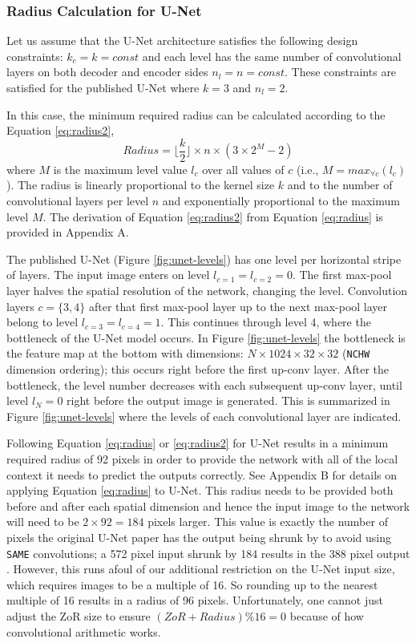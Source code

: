 \documentclass[letterpaper]{article} %
\begin{document}
\subsubsection{Radius Calculation for U-Net}

Let us assume that the U-Net architecture satisfies the following design constraints:
$k_c = k = const$ and each level has the same number of convolutional layers on both decoder and encoder sides $n_l = n = const$. These constraints are satisfied for the published U-Net where $k = 3$ and $n_l = 2$.

In this case, the minimum required radius can be calculated according to the Equation \ref{eq:radius2}, 
\begin{equation}
Radius = \lfloor \frac{k}{2} \rfloor \times n \times (3 \times 2^{M} - 2)
\label{eq:radius2}
\end{equation}
where $M$ is the maximum level value $l_c$ over all values of $c$ (i.e., $M=max_{\forall c} (l_c)$). The radius is linearly proportional to the kernel size $k$ and to the number of convolutional layers per level $n$ and exponentially proportional to the maximum level $M$. The derivation of Equation \ref{eq:radius2} from Equation \ref{eq:radius} is provided in Appendix A.

The published U-Net (Figure \ref{fig:unet-levels}) has one level per horizontal stripe of layers. The input image enters on level $l_{c=1} = l_{c=2} = 0$. The first max-pool layer halves the spatial resolution of the network, changing the level. Convolution layers $c = \{3, 4\}$ after that first max-pool layer up to the next max-pool layer belong to level $l_{c=3}=l_{c=4} = 1$. This continues through level 4, where the bottleneck of the U-Net model occurs. In Figure \ref{fig:unet-levels} the bottleneck is the feature map at the bottom with dimensions: $N \times 1024 \times 32 \times 32$ (\texttt{NCHW} dimension ordering); this occurs right before the first up-conv layer. After the bottleneck, the level number decreases with each subsequent up-conv layer, until level $l_{N} = 0$ right before the output image is generated. This is summarized in Figure \ref{fig:unet-levels} where the levels of each convolutional layer are indicated.

Following Equation \ref{eq:radius} or \ref{eq:radius2} for U-Net results in a minimum required radius of 92 pixels in order to provide the network with all of the local context it needs to predict the outputs correctly. See Appendix B for details on applying Equation \ref{eq:radius} to U-Net. This radius needs to be provided both before and after each spatial dimension and hence the input image to the network will need to be $2 \times 92 = 184$ pixels larger. This value is exactly the number of pixels the original U-Net paper has the output being shrunk by to avoid using \texttt{SAME} convolutions; a 572 pixel input shrunk by 184 results in the 388 pixel output \cite{Ronneberger2015a}. 
However, this runs afoul of our additional restriction on the U-Net input size, which requires images to be a multiple of 16. So rounding up to the nearest multiple of 16 results in a radius of 96 pixels. Unfortunately, one cannot just adjust the ZoR size to ensure $(ZoR + Radius) \% 16 = 0$ because of how convolutional arithmetic works. 
\end{document}
